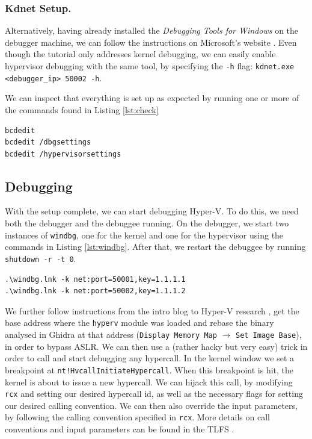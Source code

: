 \documentclass[runningheads]{llncs}
\newcommand{\cc}{\lstinline[mathescape]}
\begin{document}
\vspace{-2mm}
\subsubsection{Kdnet Setup.}

Alternatively, having already installed the \emph{Debugging Tools for Windows}
on the debugger machine, we can follow the instructions on Microsoft's website
\cite{kdnet}. Even though the tutorial only addresses kernel debugging, we can
easily enable hypervisor debugging with the same tool, by specifying the
\cc{-h} flag: \cc{kdnet.exe <debugger_ip> 50002 -h}. 

We can inspect that everything is set up as expected by running one or more of 
the commands found in Listing \ref{lst:check}

\vspace{2mm}
\begin{lstlisting}[label={lst:check}, 
    caption={Optional commands which can be run to inspect the config.}]
bcdedit
bcdedit /dbgsettings
bcdedit /hypervisorsettings
\end{lstlisting}

\subsection{Debugging}

With the setup complete, we can start debugging Hyper-V. To do this, we need both
the debugger and the debuggee running. On the debugger, we start two instances of
\cc{windbg}, one for the kernel and one for the hypervisor using the commands in
Listing \ref{lst:windbg}. After that, we restart the debuggee by running \cc{shutdown -r -t 0}. 

\vspace{2mm}
\begin{lstlisting}[label={lst:windbg},
    caption={Commands to run for starting windbg and accepting connections from
    the debuggee to the kernel and hypervisor debuggers.}]
.\windbg.lnk -k net:port=50001,key=1.1.1.1
.\windbg.lnk -k net:port=50002,key=1.1.1.2
\end{lstlisting}

We further follow instructions from the intro blog to Hyper-V research
\cite{intro_hyperv}, get the base address where the \cc{hyperv} module was
loaded and rebase the binary analysed in Ghidra at that address (\cc{Display Memory Map} $\to$ \cc{Set Image Base}), in order to bypass ASLR. We can then
use a (rather hacky but very easy) trick in order to call and start debugging
any hypercall. In the kernel window we set a breakpoint at
\cc{nt!HvcallInitiateHypercall}. When this breakpoint is hit, the kernel is
about to issue a new hypercall. We can hijack this call, by modifying \cc{rcx}
and setting our desired hypercall id, as well as the necessary flags for
setting our desired calling convention. We can then also override the input
parameters, by following the calling convention specified in \cc{rcx}. More
details on call conventions and input parameters can be found in the TLFS \cite{tlfs}.
\end{document}
